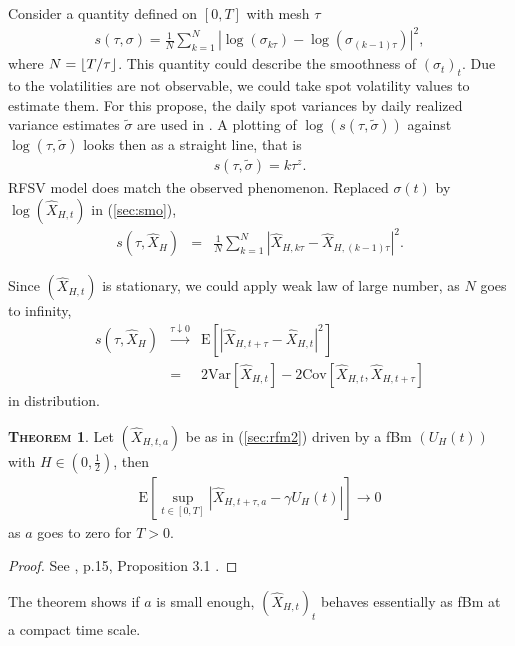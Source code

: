 \documentclass[a4paper, twoside, 11pt]{article}
\theoremstyle{definition}
\newtheorem{theorem}[definition]{\scshape Theorem}
\DeclarePairedDelimiter\floor{\lfloor}{\rfloor}
\begin{document}
Consider a quantity defined on $[0, T]$ with mesh $\tau$
\begin{eqnarray}
  s(\tau, \sigma) = \frac{1}{N}\sum\limits_{k=1}^N|\log(\sigma_{k\tau}) - \log(\sigma_{(k-1)\tau})|^2,
  \label{sec:smo}
\end{eqnarray}
where $N = \floor{T/\tau}$. This quantity could describe the smoothness of $(\sigma_t)_t$. Due to the volatilities are not observable, we could take spot volatility values to estimate them. For this propose, the daily spot variances by daily realized variance estimates $\tilde{\sigma}$ are used in \cite{chridito}. A plotting of $\log(s(\tau, \tilde{\sigma}))$ against $\log(\tau, \tilde{\sigma})$ looks then as a straight line, that is
\begin{eqnarray}
  s(\tau, \tilde{\sigma}) =  k\tau^z.
  \label{sec:smth}
\end{eqnarray}
RFSV model does match the observed phenomenon. Replaced  $\sigma(t)$ by $\log(\hat{X}_{H,t})$ in (\ref{sec:smo}),
\begin{eqnarray}
  s(\tau, \hat{X}_{H}) &=&  \frac {1}{N}\sum\limits_{k=1}^N|\hat{X}_{H,k\tau} - \hat{X}_{H,(k-1)\tau}|^2\nonumber.
\end{eqnarray}

Since $(\hat{X}_{H,t})$ is stationary, we could apply weak law of large number, as $N$ goes to infinity,
\begin{eqnarray}
  s(\tau, \hat{X}_{H}) &\overset{\tau\downarrow0}{\rightarrow}& \mathrm{E}[|\hat{X}_{H,t+\tau}-\hat{X}_{H,t}|^2]\nonumber\\
  &=& 2 \mathrm{Var}[\hat{X}_{H,t}] - 2 \mathrm{Cov}[\hat{X}_{H,t}, \hat{X}_{H,t+\tau}]\nonumber
  \label{sec:smtsv}
\end{eqnarray}
in distribution.
\begin{theorem}
  Let $(\hat{X}_{H, t, a})$ be as in (\ref{sec:rfm2}) driven by a fBm $(U_H(t))$ with $H\in (0,\frac{1}{2})$, then
  \begin{eqnarray*}
	\mathrm{E}[\sup\limits_{t\in [0, T]}|\hat{X}_{H,t+\tau, a} - \gamma U_H(t)|]\rightarrow 0
  \end{eqnarray*}
 as $a$ goes to zero for $T > 0$.
\end{theorem}
\begin{proof}
  See \cite{gradin}, p.15, Proposition 3.1 .
\end{proof}

The theorem shows if $a$ is small enough, $(\hat{X}_{H, t})_t$ behaves essentially as fBm at a compact time scale.
\end{document}

